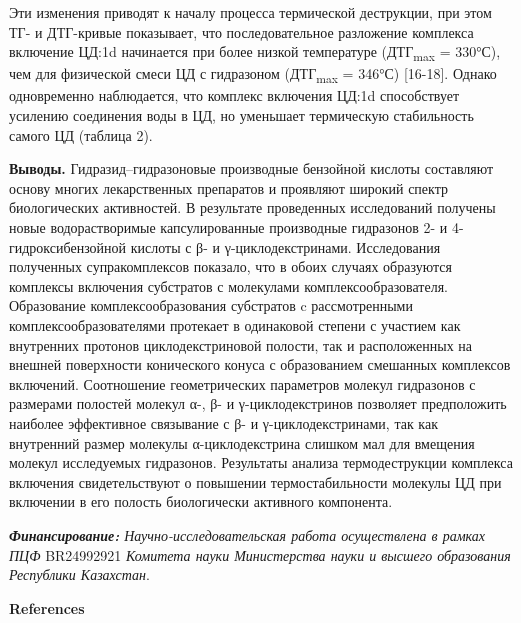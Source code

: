\begin{multicols}{2}
Эти изменения приводят к началу процесса термической деструкции, при
этом ТГ- и ДТГ-кривые показывает, что последовательное разложение
комплекса включение ЦД:1d начинается при более низкой температуре
(ДТГ\textsubscript{max} = 330°С), чем для физической смеси ЦД с
гидразоном (ДТГ\textsubscript{max} = 346°С) {[}16-18{]}. Однако
одновременно наблюдается, что комплекс включения ЦД:1d способствует
усилению соединения воды в ЦД, но уменьшает термическую стабильность
самого ЦД (таблица 2).

{\bfseries Выводы.} Гидразид--гидразоновые производные бензойной кислоты
составляют основу многих лекарственных препаратов и проявляют широкий
спектр биологических активностей. В результате проведенных исследований
получены новые водорастворимые капсулированные производные гидразонов 2-
и 4-гидроксибензойной кислоты с β- и γ-циклодекстринами. Исследования
полученных супракомплексов показало, что в обоих случаях образуются
комплексы включения субстратов с молекулами комплексообразователя.
Образование комплексообразования субстратов c рассмотренными
комплексообразователями протекает в одинаковой степени с участием как
внутренних протонов циклодекстриновой полости, так и расположенных на
внешней поверхности конического конуса с образованием смешанных
комплексов включений. Соотношение геометрических параметров молекул
гидразонов с размерами полостей молекул α-, β- и γ-циклодекстринов
позволяет предположить наиболее эффективное связывание с β- и
γ-циклодекстринами, так как внутренний размер молекулы α-циклодекстрина
слишком мал для вмещения молекул исследуемых гидразонов. Результаты
анализа термодеструкции комплекса включения свидетельствуют о повышении
термостабильности молекулы ЦД при включении в его полость биологически
активного компонента.

\emph{{\bfseries Финансирование:} Научно-исследовательская работа
осуществлена в рамках ПЦФ} BR24992921 \emph{Комитета науки Министерства
науки и высшего образования Республики Казахстан}.
\end{multicols}

\begin{center}
{\bfseries References}
\end{center}


